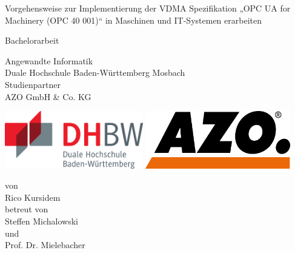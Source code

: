 \def\doctype{Bachelorarbeit}
\def\title{Vorgehensweise zur Implementierung der VDMA Spezifikation „OPC UA for Machinery (OPC 40 001)“ in Maschinen und IT-Systemen erarbeiten}
\def\author{Rico Kursidem}
\def\supervisor{Steffen Michalowski}
\def\supervisortwo{Prof. Dr. Mielebacher}

\begin{titlepage}

\vspace{10mm}

\begin{center}
	
	\vspace{5mm}
	\huge \title
	
	\vspace{34pt}
	\large \doctype
		
	\vspace{30pt}	
	\small Angewandte Informatik \\
	\large Duale Hochschule Baden-Württemberg Mosbach \\
	\small Studienpartner \\
	\large AZO GmbH \& Co. KG \\
    \vspace{35pt}
    
    \includegraphics[height=2.5cm]{prefix/image/logo-dhbw.eps}
    \includegraphics[height=2.5cm]{prefix/image/logo-azo.png}
	
	\vspace{40pt}	
	\small von \\
	\large \author \\
	\small betreut von \\
	\large \supervisor \\
	\small und \\
	\large \supervisortwo

\end{center}

\vspace{75pt}


\vspace{49.7pt}


\end{titlepage}
